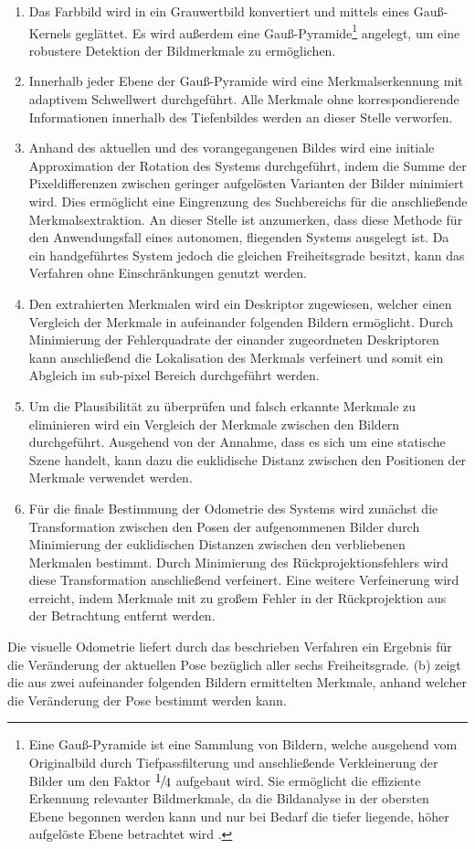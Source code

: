 \begin{enumerate}
\item Das Farbbild wird in ein Grauwertbild konvertiert und mittels eines Gauß-Kernels geglättet. Es wird außerdem eine Gauß-Pyramide\footnote{Eine Gauß-Pyramide ist eine Sammlung von Bildern, welche ausgehend vom Originalbild durch Tiefpassfilterung und anschließende Verkleinerung der Bilder um den Faktor $\nicefrac{1}{4}$ aufgebaut wird. Sie ermöglicht die effiziente Erkennung relevanter Bildmerkmale, da die Bildanalyse in der obersten Ebene begonnen werden kann und nur bei Bedarf die tiefer liegende, höher aufgelöste Ebene betrachtet wird \cite{Nischwitz20112}.} angelegt, um eine robustere Detektion der Bildmerkmale zu ermöglichen.
\item Innerhalb jeder Ebene der Gauß-Pyramide wird eine Merkmalserkennung mit adaptivem Schwellwert durchgeführt. Alle Merkmale ohne korrespondierende Informationen innerhalb des Tiefenbildes werden an dieser Stelle verworfen.
\item Anhand des aktuellen und des vorangegangenen Bildes wird eine initiale Approximation der Rotation des Systems durchgeführt, indem die Summe der Pixeldifferenzen zwischen geringer aufgelösten Varianten der Bilder minimiert wird. Dies ermöglicht eine Eingrenzung des Suchbereichs für die anschließende Merkmalsextraktion. An dieser Stelle ist anzumerken, dass diese Methode für den Anwendungsfall eines autonomen, fliegenden Systems ausgelegt ist. Da ein handgeführtes System jedoch die gleichen Freiheitsgrade besitzt, kann das Verfahren ohne Einschränkungen genutzt werden.
\item Den extrahierten Merkmalen wird ein Deskriptor zugewiesen, welcher einen Vergleich der Merkmale in aufeinander folgenden Bildern ermöglicht. Durch Minimierung der Fehlerquadrate der einander zugeordneten Deskriptoren kann anschließend die Lokalisation des Merkmals verfeinert und somit ein Abgleich im sub-pixel Bereich durchgeführt werden.
\item Um die Plausibilität zu überprüfen und falsch erkannte Merkmale zu eliminieren wird ein Vergleich der Merkmale zwischen den Bildern durchgeführt. Ausgehend von der Annahme, dass es sich um eine statische Szene handelt, kann dazu die euklidische Distanz zwischen den Positionen der Merkmale verwendet werden.
\item Für die finale Bestimmung der Odometrie des Systems wird zunächst die Transformation zwischen den Posen der aufgenommenen Bilder durch Minimierung der euklidischen Distanzen zwischen den verbliebenen Merkmalen bestimmt. Durch Minimierung des Rückprojektionsfehlers wird diese Transformation anschließend verfeinert. Eine weitere Verfeinerung wird erreicht, indem Merkmale mit zu großem Fehler in der Rückprojektion aus der Betrachtung entfernt werden.
\end{enumerate}
Die visuelle Odometrie liefert durch das beschrieben Verfahren ein Ergebnis für die Veränderung der aktuellen Pose bezüglich aller sechs Freiheitsgrade.  (b) zeigt die aus zwei aufeinander folgenden Bildern ermittelten Merkmale, anhand welcher die Veränderung der Pose bestimmt werden kann.\\

